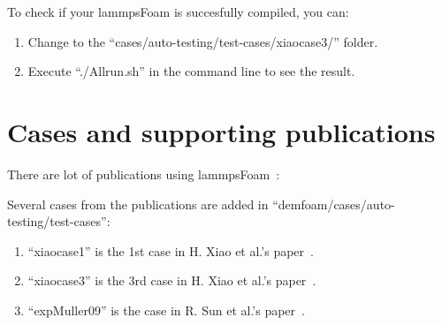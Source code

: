 \documentclass[11pt]{article}
\begin{document}
To check if your lammpsFoam is succesfully compiled, you can:
\begin{enumerate}
    \item Change to the ``cases/auto-testing/test-cases/xiaocase3/'' folder. 
    \item Execute ``./Allrun.sh'' in the command line to see the result.
\end{enumerate}

\section{Cases and supporting publications}

There are lot of publications using
lammpsFoam~\cite{sun09,xiao-cicp,gupta11a,gupta11b,gupta11b,gxs11a,gupta13a,gupta12,part1,part2}:

Several cases from the publications are added in ``demfoam/cases/auto-testing/test-cases'':
\begin{enumerate}
    \item ``xiaocase1'' is the 1st case in H. Xiao et al.'s paper~\cite{xiao-cicp}.
    \item ``xiaocase3'' is the 3rd case in H. Xiao et al.'s paper~\cite{xiao-cicp}.
    \item ``expMuller09'' is the case in R. Sun et al.'s paper~\cite{part1,part2}.
\end{enumerate}




\end{document}
